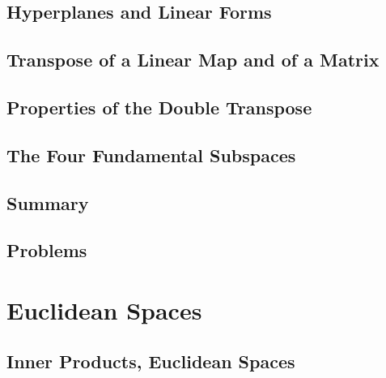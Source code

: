 \documentclass[a4paper]{article}
\begin{document}
\subsection{ Hyperplanes and Linear Forms} %

\subsection{ Transpose of a Linear Map and of a Matrix} %

\subsection{ Properties of the Double Transpose} %

\subsection{ The Four Fundamental Subspaces} %

\subsection{ Summary} %

\subsection{ Problems} %


\newpage
\section{Euclidean Spaces}
\subsection{ Inner Products, Euclidean Spaces} %
\end{document}
